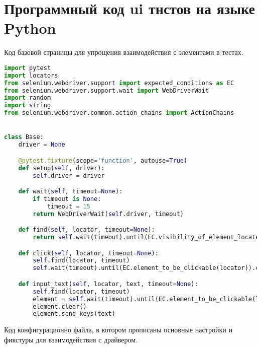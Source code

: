 \chapter{Программный код ui тнстов на языке Python}\label{appendix-extra-examples}

Код базовой страницы для упрощения взаимодействия с элементами в тестах.

\begin{lstlisting}[language=Python]
import pytest
import locators
from selenium.webdriver.support import expected_conditions as EC
from selenium.webdriver.support.wait import WebDriverWait
import random
import string
from selenium.webdriver.common.action_chains import ActionChains


class Base:
    driver = None

    @pytest.fixture(scope='function', autouse=True)
    def setup(self, driver):
        self.driver = driver

    def wait(self, timeout=None):
        if timeout is None:
            timeout = 15
        return WebDriverWait(self.driver, timeout)

    def find(self, locator, timeout=None):
        return self.wait(timeout).until(EC.visibility_of_element_located(locator))

    def click(self, locator, timeout=None):
        self.find(locator, timeout)
        self.wait(timeout).until(EC.element_to_be_clickable(locator)).click()

    def input_text(self, locator, text, timeout=None):
        self.find(locator, timeout)
        element = self.wait(timeout).until(EC.element_to_be_clickable(locator))
        element.clear()
        element.send_keys(text)

\end{lstlisting}

Код конфигурационно файла, в котором прописаны основные настройки и фикстуры для взаимодействия с драйвером.

